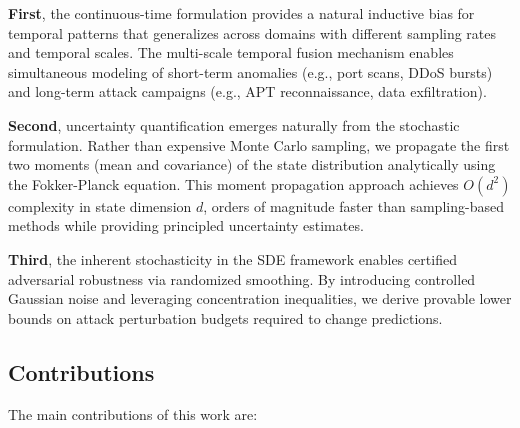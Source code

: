 \documentclass[10pt,journal,compsoc]{IEEEtran}
\begin{document}
\textbf{First}, the continuous-time formulation provides a natural inductive bias for temporal patterns that generalizes across domains with different sampling rates and temporal scales. The multi-scale temporal fusion mechanism enables simultaneous modeling of short-term anomalies (e.g., port scans, DDoS bursts) and long-term attack campaigns (e.g., APT reconnaissance, data exfiltration).

\textbf{Second}, uncertainty quantification emerges naturally from the stochastic formulation. Rather than expensive Monte Carlo sampling, we propagate the first two moments (mean and covariance) of the state distribution analytically using the Fokker-Planck equation. This moment propagation approach achieves $O(d^2)$ complexity in state dimension $d$, orders of magnitude faster than sampling-based methods while providing principled uncertainty estimates.

\textbf{Third}, the inherent stochasticity in the SDE framework enables certified adversarial robustness via randomized smoothing. By introducing controlled Gaussian noise and leveraging concentration inequalities, we derive provable lower bounds on attack perturbation budgets required to change predictions.

\vspace{-0.2cm}
\subsection{Contributions}

The main contributions of this work are:
\end{document}

